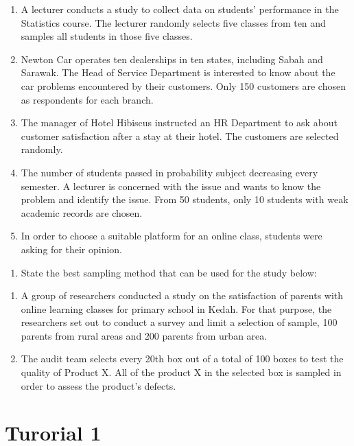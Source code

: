 \documentclass[
  a4paper,
  DIV=11,
  numbers=noendperiod,
  oneside]{scrreprt}
\providecommand{\tightlist}{%
  \setlength{\itemsep}{0pt}\setlength{\parskip}{0pt}}\usepackage{longtable,booktabs,array}
\begin{document}
\begin{enumerate}
\def\labelenumi{\alph{enumi})}
\tightlist
\item
  A lecturer conducts a study to collect data on students' performance
  in the Statistics course. The lecturer randomly selects five classes
  from ten and samples all students in those five classes.
\item
  Newton Car operates ten dealerships in ten states, including Sabah and
  Sarawak. The Head of Service Department is interested to know about
  the car problems encountered by their customers. Only 150 customers
  are chosen as respondents for each branch.
\item
  The manager of Hotel Hibiscus instructed an HR Department to ask about
  customer satisfaction after a stay at their hotel. The customers are
  selected randomly.
\item
  The number of students passed in probability subject decreasing every
  semester. A lecturer is concerned with the issue and wants to know the
  problem and identify the issue. From 50 students, only 10 students
  with weak academic records are chosen.
\item
  In order to choose a suitable platform for an online class, students
  were asking for their opinion.
\end{enumerate}

\begin{enumerate}
\def\labelenumi{\arabic{enumi}.}
\setcounter{enumi}{8}
\tightlist
\item
  State the best sampling method that can be used for the study below:
\end{enumerate}

\begin{enumerate}
\def\labelenumi{\alph{enumi})}
\tightlist
\item
  A group of researchers conducted a study on the satisfaction of
  parents with online learning classes for primary school in Kedah. For
  that purpose, the researchers set out to conduct a survey and limit a
  selection of sample, 100 parents from rural areas and 200 parents from
  urban area.
\item
  The audit team selects every 20th box out of a total of 100 boxes to
  test the quality of Product X. All of the product X in the selected
  box is sampled in order to assess the product's defects.
\end{enumerate}

\hypertarget{turorial-1}{%
\section{Turorial 1}\label{turorial-1}}
\end{document}
